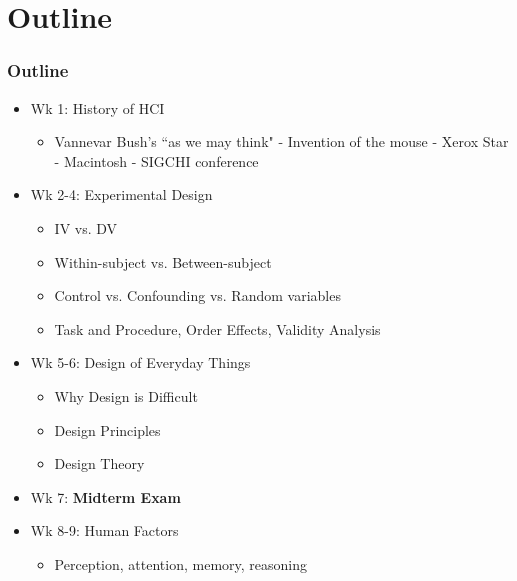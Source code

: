 \documentclass{beamer}
\begin{document}
\section{Outline} %

\begin{frame}
\frametitle{Outline}
\begin{itemize}
	\item Wk 1: History of HCI
	\begin{itemize}
		\item Vannevar Bush's ``as we may think" - Invention of the mouse - Xerox Star - Macintosh - SIGCHI conference
	\end{itemize}
	\item Wk 2-4: Experimental Design
	\begin{itemize}
		\item IV vs. DV
		\item Within-subject vs. Between-subject
		\item Control vs. Confounding vs. Random variables
		\item Task and Procedure, Order Effects, Validity Analysis
	\end{itemize}
	\item Wk 5-6: Design of Everyday Things
	\begin{itemize}
	    \item Why Design is Difficult
		\item Design Principles 
		\item Design Theory
	\end{itemize}	
	\item Wk 7: \textbf{Midterm Exam}
	\item Wk 8-9: Human Factors
		\begin{itemize}
			\item Perception, attention, memory, reasoning
		\end{itemize}
\end{itemize}
\end{frame}
\end{document}
